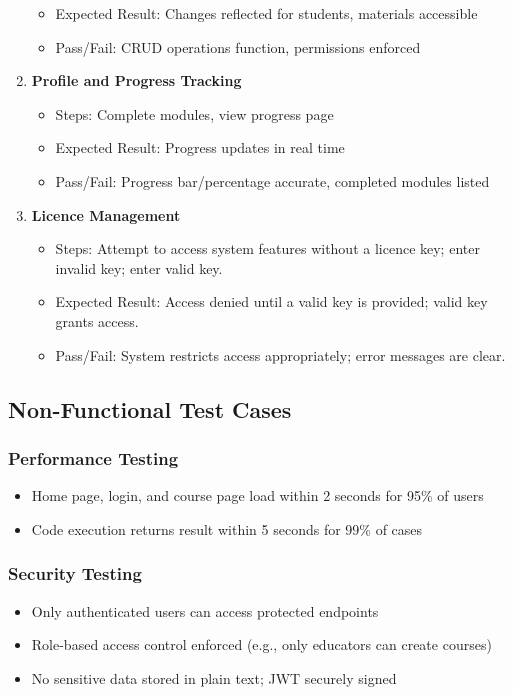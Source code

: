 \documentclass[a4paper,11pt]{scrartcl}
\begin{document}
\begin{enumerate}[leftmargin=*]
\begin{itemize}
            \item Expected Result: Changes reflected for students, materials accessible
            \item Pass/Fail: CRUD operations function, permissions enforced
        \end{itemize}
    \item \textbf{Profile and Progress Tracking}
        \begin{itemize}
            \item Steps: Complete modules, view progress page
            \item Expected Result: Progress updates in real time
            \item Pass/Fail: Progress bar/percentage accurate, completed modules listed
        \end{itemize}
        \item \textbf{Licence Management}
        \begin{itemize}
            \item Steps: Attempt to access system features without a licence key; enter invalid key; enter valid key.
            \item Expected Result: Access denied until a valid key is provided; valid key grants access.
            \item Pass/Fail: System restricts access appropriately; error messages are clear.
        \end{itemize}
\end{enumerate}

\subsection{Non-Functional Test Cases}

\subsubsection{Performance Testing}
\begin{itemize}[leftmargin=*]
    \item Home page, login, and course page load within 2 seconds for 95\% of users
    \item Code execution returns result within 5 seconds for 99\% of cases
\end{itemize}

\subsubsection{Security Testing}
\begin{itemize}[leftmargin=*]
    \item Only authenticated users can access protected endpoints
    \item Role-based access control enforced (e.g., only educators can create courses)
    \item No sensitive data stored in plain text; JWT securely signed
\end{itemize}
\end{document}
